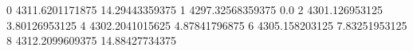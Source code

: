 0 4311.6201171875 14.29443359375
1 4297.32568359375 0.0
2 4301.126953125 3.80126953125
4 4302.2041015625 4.87841796875
6 4305.158203125 7.83251953125
8 4312.2099609375 14.88427734375
